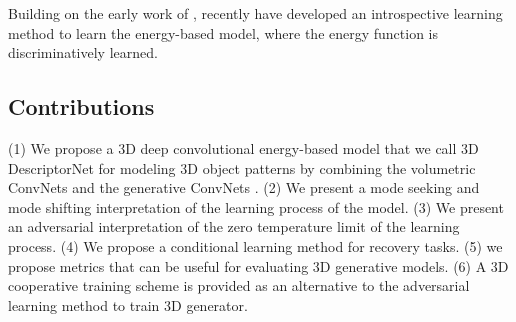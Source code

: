 \documentclass[10pt,twocolumn,letterpaper]{article}
\begin{document}

Building on the early work of \cite{tu2007learning}, recently \cite{jin2017introspective, lazarow2017introspective} have developed an introspective learning method to learn the energy-based model, where the energy function is discriminatively learned. 

\subsection{Contributions}
(1) We propose a 3D deep convolutional energy-based model that we call  3D DescriptorNet for  modeling 3D object patterns by combining the volumetric ConvNets \cite{maturana2015voxnet} and the generative ConvNets \cite{XieLuICML}. (2) We present a mode seeking and mode shifting interpretation of the learning process of the model. (3) We present an adversarial interpretation of the zero temperature limit of the learning process. (4) We propose a conditional learning method for recovery tasks. (5) we  propose  metrics that can be useful for evaluating 3D generative models. (6) A 3D cooperative training scheme is provided as an alternative to the adversarial learning method to train 3D generator.    


\end{document}
